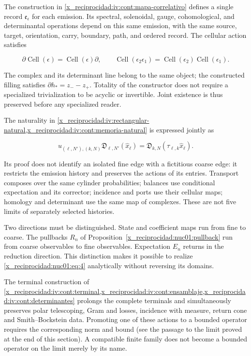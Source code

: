 The construction in \cref{x_reciprocidad:iv:cont:mapa-correlativo} defines a single record \(\mathfrak e_\epsilon\) for each emission. Its spectral, solenoidal, gauge, cohomological, and determinantal operations depend on this same emission, with the same source, target, orientation, carry, boundary, path, and ordered record. The cellular action satisfies

\[
\partial\operatorname{Cell}(\epsilon)=\operatorname{Cell}(\epsilon)\partial,
\qquad
\operatorname{Cell}(\epsilon_2\epsilon_1)
=\operatorname{Cell}(\epsilon_2)\operatorname{Cell}(\epsilon_1).
\]

The complex and its determinant line belong to the same object; the constructed filling satisfies \(\partial h_*=z_--z_+\). Totality of the constructor does not require a specialized trivialization to be acyclic or invertible. Joint existence is thus preserved before any specialized reader.

The naturality in \cref{x_reciprocidad:iv:rectangular-natural,x_reciprocidad:iv:cont:memoria-natural} is expressed jointly as

\begin{equation}
u_{(\ell,N'),(k,N)}\mathfrak D_{\ell,N'}(\widehat x_\ell)
=\mathfrak D_{k,N}(\tau_{\ell,k}\widehat x_\ell).
\label{x_reciprocidad:nuc01:eq:4}
\end{equation}

Its proof does not identify an isolated fine edge with a fictitious coarse edge: it restricts the emission history and preserves the actions of its entries. Transport composes over the same cylinder probabilities; balances use conditional expectation and its corrector; incidence and ports use their cellular maps; homology and determinant use the same map of complexes. These are not five limits of separately selected histories.

Two directions must be distinguished. State and coefficient maps run from fine to coarse. The pullbacks \(R_n\) of Proposition~\ref{x_reciprocidad:nuc01:pullback} run from coarse observables to fine observables. Expectation \(E_n\) returns in the reduction direction. This distinction makes it possible to realize \eqref{x_reciprocidad:nuc01:eq:4} analytically without reversing its domains.

The terminal construction of \cref{x_reciprocidad:iv:cont:terminal,x_reciprocidad:iv:cont:ensamblaje,x_reciprocidad:iv:cont:determinantes} prolongs the complete terminals and simultaneously preserves polar telescoping, Gram and losses, incidence with measure, return cone and Smith–Bockstein data. Promoting one of these actions to a bounded operator requires the corresponding norm and bound (see the passage to the limit proved at the end of this section). A compatible finite family does not become a bounded operator on the limit merely by its name.

